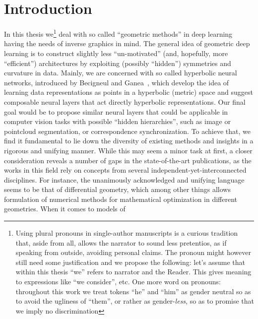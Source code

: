\chapter{Introduction}


In this thesis we\footnote{
Using plural pronouns in single-author manuscripts is a curious tradition that,
aside from all, allows the narrator to sound less pretentios, as if speaking
from outside, avoiding personal claims. The pronoun might however still need
some justification and we propose the following: let's assume that within this
thesis ``we'' refers to narrator and the Reader. This gives meaning to
expressions like ``we consider'', etc.  One more word on pronouns: throughout
this work we treat tokens ``he'' and ``him'' as gender neutral so as to avoid
the ugliness of ``them'', or rather as gender-\emph{less}, so as to promise
that we imply no discrimination}
deal with so called ``geometric methods'' in deep learning having the needs of
inverse graphics in mind. The general idea of geometric deep learning is to
construct slightly less ``un-motivated'' (and, hopefully, more ``efficient'')
architectures by exploiting (possibly ``hidden'') symmetries and curvature in
data. Mainly, we are concerned with so called hyperbolic neural networks,
introduced by Becigneul and Ganea~\cite{ganeaHNNs}, which develop the idea of
learning data representations as points in a hyperbolic (metric) space and
suggest composable neural layers that act directly hyperbolic representations.
Our final goal would be to propose similar neural layers that could be
applicable in computer vision tasks with possible ``hidden hierarchies'', such
as image or pointcloud segmentation, or correspondence synchronization. To
achieve that, we find it fundamental to lie down the diversity of existing
methods and insights in a rigorous and unifying manner. While this may seem a
minor task at first, a closer consideration reveals a number of gaps in the
state-of-the-art publications, as the works in this field rely on concepts from
several independent-yet-interconnected disciplines. For instance, the
unanimously acknowledged and unifying language seems to be that of differential
geometry, which among other things allows formulation of numerical methods for
mathematical optimization in different geometries. When it comes to models of
